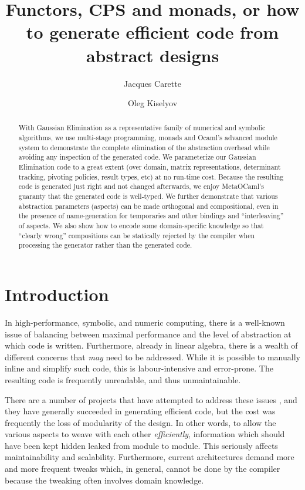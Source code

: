 \documentclass{llncs}
\begin{document}
\title{Functors, CPS and monads, or how to generate efficient
code from abstract designs}
\author{Jacques Carette
 \and
Oleg Kiselyov
}

\maketitle

\begin{abstract}
With Gaussian Elimination as a representative family of numerical
and symbolic
algorithms, we use multi-stage programming, monads and Ocaml's
advanced module system to demonstrate the complete elimination of the
abstraction overhead while avoiding any inspection of the generated
code.  We parameterize our Gaussian Elimination code to a great extent
(over domain, matrix representations, determinant tracking, 
pivoting policies, result types, etc) at no run-time cost.  Because
the resulting code is generated just right and not changed afterwards,
we enjoy MetaOCaml's guaranty that the generated code is well-typed.
We further demonstrate that various abstraction parameters (aspects)
can be made orthogonal and compositional, even in the presence of
name-generation for temporaries and other bindings and
``interleaving'' of aspects.  We also show how to encode some
domain-specific knowledge so that ``clearly wrong'' compositions can
be statically rejected by the compiler when processing the generator
rather than the generated code.
\end{abstract}

\section{Introduction}

In high-performance, symbolic, and numeric computing, there is a well-known
issue of balancing between maximal performance and the level of
abstraction at which code is written.  Furthermore, already in
linear algebra, there is a wealth of different concerns that 
\emph{may} need to be addressed.  While it is possible to manually
inline and simplify such code, this is labour-intensive and 
error-prone.  The resulting code is frequently unreadable,
and thus unmaintainable.

There are a number of projects that have attempted to address these issues
\cite{Czarnecki,Veldhuizen:1998:ISCOPE,musser94algorithmoriented,BOOST,POOMA,ATLAS}, 
and they have generally succeeded in generating
efficient code, but the cost was frequently the loss of modularity
of the design.  In other words, to allow the various aspects to
weave with each other \emph{efficiently}, information which should
have been kept hidden leaked from module to module.  This seriously
affects maintainability and scalability.  Furthermore, current architectures
demand more and more frequent tweaks which, in general, cannot be done by the
compiler because the tweaking often involves domain knowledge.  
\end{document}
